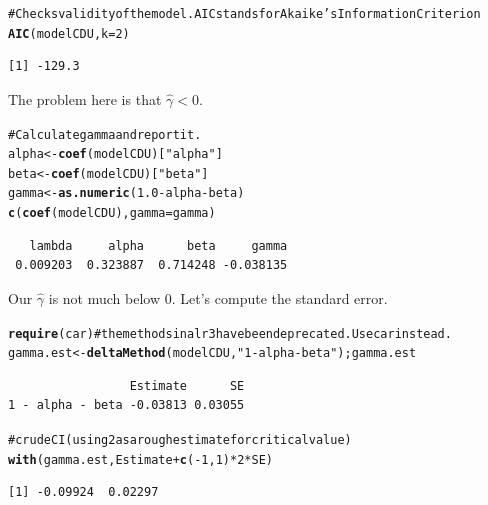 \documentclass[preprint,authoryear,12pt]{elsarticle}\usepackage{graphicx, color}
\makeatletter
\newcommand{\hlfunctioncall}[1]{\textcolor[rgb]{0.501960784313725,0,0.329411764705882}{\textbf{#1}}}%
\newcommand{\hlstring}[1]{\textcolor[rgb]{0.6,0.6,1}{#1}}%
\newcommand{\hlcomment}[1]{\textcolor[rgb]{0.180392156862745,0.6,0.341176470588235}{#1}}%
\newenvironment{kframe}{%
 \def\at@end@of@kframe{}%
 \ifinner\ifhmode%
  \def\at@end@of@kframe{\end{minipage}}%
  \begin{minipage}{\columnwidth}%
 \fi\fi%
 \def\FrameCommand##1{\hskip\@totalleftmargin \hskip-\fboxsep
 \colorbox{shadecolor}{##1}\hskip-\fboxsep
     \hskip-\linewidth \hskip-\@totalleftmargin \hskip\columnwidth}%
 \MakeFramed {\advance\hsize-\width
   \@totalleftmargin\z@ \linewidth\hsize
   \@setminipage}}%
 {\par\unskip\endMakeFramed%
 \at@end@of@kframe}
\newenvironment{knitrout}{}{} %
\makeatother
\begin{document}
\begin{knitrout}
\color{fgcolor}\begin{kframe}
\begin{alltt}
\hlcomment{# Checks validity of the model. AIC stands for Akaike's Information Criterion}
\hlfunctioncall{AIC}(modelCDU, k=2)
\end{alltt}
\begin{verbatim}
[1] -129.3
\end{verbatim}
\end{kframe}
\end{knitrout}


The problem here is that $\hat \gamma < 0$.
\begin{knitrout}
\color{fgcolor}\begin{kframe}
\begin{alltt}
\hlcomment{# Calculate gamma and report it.}
alpha <- \hlfunctioncall{coef}(modelCDU)[\hlstring{"alpha"}] 
beta <- \hlfunctioncall{coef}(modelCDU)[\hlstring{"beta"}] 
gamma <- \hlfunctioncall{as.numeric}(1.0 - alpha - beta)
\hlfunctioncall{c}(\hlfunctioncall{coef}(modelCDU), gamma=gamma)
\end{alltt}
\begin{verbatim}
   lambda     alpha      beta     gamma 
 0.009203  0.323887  0.714248 -0.038135 
\end{verbatim}
\end{kframe}
\end{knitrout}


Our $\hat\gamma$ is not much below $0$.  Let's compute the standard error.
\begin{knitrout}
\color{fgcolor}\begin{kframe}
\begin{alltt}
\hlfunctioncall{require}(car)  \hlcomment{# the methods in alr3 have been deprecated.  Use car instead.}
gamma.est <- \hlfunctioncall{deltaMethod}(modelCDU, \hlstring{"1-alpha-beta"}); gamma.est
\end{alltt}
\begin{verbatim}
                 Estimate      SE
1 - alpha - beta -0.03813 0.03055
\end{verbatim}
\begin{alltt}
\hlcomment{# crude CI (using 2 as a rough estimate for critical value)}
\hlfunctioncall{with}(gamma.est, Estimate + \hlfunctioncall{c}(-1,1) * 2 * SE)
\end{alltt}
\begin{verbatim}
[1] -0.09924  0.02297
\end{verbatim}
\end{kframe}
\end{knitrout}
\end{document}

